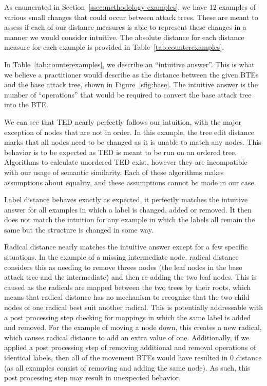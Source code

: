 As enumerated in Section~\ref{ssec:methodology-examples}, we have 12 examples of various small changes that could occur between attack trees. These are meant to assess if each of our distance measures is able to represent these changes in a manner we would consider intuitive. The absolute distance for each distance measure for each example is provided in Table~\ref{tab:counterexamples}.

In Table~\ref{tab:counterexamples}, we describe an ``intuitive answer''. This is what we believe a practitioner would describe as the distance between the given BTEs and the base attack tree, shown in Figure~\ref{sfig:base}. The intuitive answer is the number of ``operations'' that would be required to convert the base attack tree into the BTE.

We can see that TED nearly perfectly follows our intuition, with the major exception of nodes that are not in order. In this example, the tree edit distance marks that all nodes need to be changed as it is unable to match any nodes. This behavior is to be expected as TED is meant to be run on an ordered tree. Algorithms to calculate unordered TED exist, however they are incompatible with our usage of semantic similarity. Each of these algorithms makes assumptions about equality, and these assumptions cannot be made in our case.

Label distance behaves exactly as expected, it perfectly matches the intuitive answer for all examples in which a label is changed, added or removed. It then does not match the intuition for any example in which the labels all remain the same but the structure is changed in some way.

Radical distance nearly matches the intuitive answer except for a few specific situations. In the example of a missing intermediate node, radical distance considers this as needing to remove threes nodes (the leaf nodes in the base attack tree and the intermediate) and then re-adding the two leaf nodes. This is caused as the radicals are mapped between the two trees by their roots, which means that radical distance has no mechanism to recognize that the two child nodes of one radical best suit another radical. This is potentially addressable with a post processing step checking for mappings in which the same label is added and removed. For the example of moving a node down, this creates a new radical, which causes radical distance to add an extra value of one. Additionally, if we applied a post processing step of removing additional and removal operations of identical labels, then all of the movement BTEs would have resulted in 0 distance (as all examples consist of removing and adding the same node). As such, this post processing step may result in unexpected behavior.

